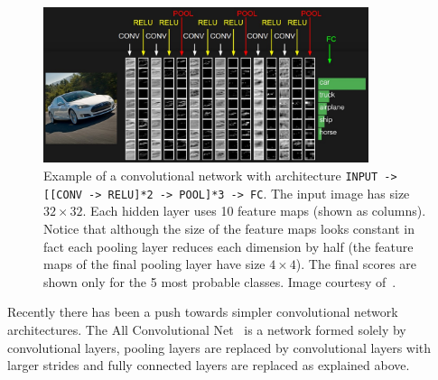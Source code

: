 \begin{figure}[h]
	\centering
	\includegraphics[width = 0.85\textwidth]{plots/convNetExample.jpeg}
	\caption[Example of a convolutional network in action]{Example of a convolutional network with architecture \texttt{INPUT -> [[CONV -> RELU]*2 -> POOL]*3 -> FC}. The input image has size $32\times 32$. Each hidden layer uses 10 feature maps (shown as columns). Notice that although the size of the feature maps looks constant in fact each pooling layer reduces each dimension by half (the feature maps of the final pooling layer have size $4\times 4$). The final scores are shown only for the 5 most probable classes. Image courtesy of~\cite{Karpathy2015}.}
	\label{fig:ConvNetExample}
\end{figure}

Recently there has been a push towards simpler convolutional network architectures. The All Convolutional Net~\cite{Springenberg2014} is a network formed solely by convolutional layers, pooling layers are replaced by convolutional layers with larger strides and fully connected layers are replaced as explained above.

